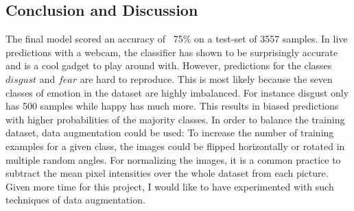 \documentclass[twoside]{article}
\begin{document}
\begin{multicols}{2}
\section{Conclusion and Discussion}

The final model scored an accuracy of ~75\% on a test-set of 3557 samples. In live predictions with a webcam, the classifier has shown to be surprisingly accurate and is a cool gadget to play around with. However, predictions for the classes $disgust$ and $fear$ are hard to reproduce. This is most likely because the seven classes of emotion in the dataset are highly imbalanced. For instance disgust only has 500 samples while happy has much more. This results in biased predictions with higher probabilities of the majority classes. In order to balance the training dataset, data augmentation could be used: To increase the number of training examples for a given class, the images could be flipped horizontally or rotated in multiple random angles. For normalizing the images, it is a common practice to subtract the mean pixel intensities over the whole dataset from each picture. Given more time for this project, I would like to have experimented with such techniques of data augmentation. 




%
%
%	
%    
%
% 






\end{multicols}
\end{document}
